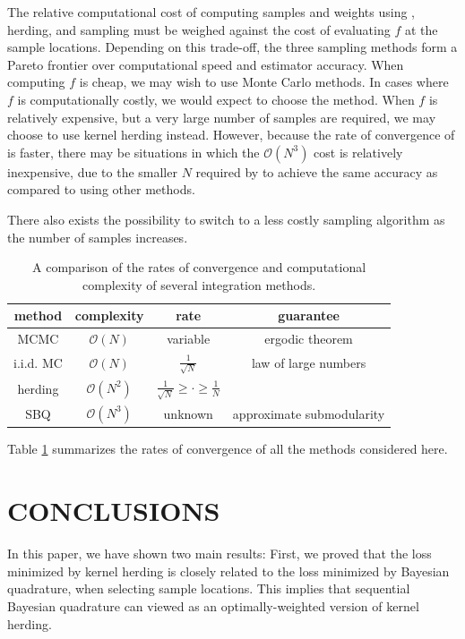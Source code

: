 The relative computational cost of computing samples and weights using \bq{}, herding, and sampling must be weighed against the cost of evaluating $f$ at the sample locations.  Depending on this trade-off, the three sampling methods form a Pareto frontier over computational speed and estimator accuracy.  When computing $f$ is cheap, we may wish to use Monte Carlo methods.  In cases where $f$ is computationally costly, we would expect to choose the \sbq{} method.  When $f$ is relatively expensive, but a very large number of samples are required, we may choose to use kernel herding instead.  However, because the rate of convergence of \sbq{} is faster, there may be situations in which the $\mathcal{O}(N^3)$ cost is relatively inexpensive, due to the smaller $N$ required by \sbq{} to achieve the same accuracy as compared to using other methods.  

There also exists the possibility to switch to a less costly sampling algorithm as the number of samples increases.
%
\begin{table}[t]
\begin{center}
\begin{tabular}{c|ccc}
method & complexity & rate & guarantee\\
\midrule
MCMC & $\mathcal{O}(N)$ & variable & ergodic theorem\\
i.i.d. MC & $\mathcal{O}(N)$ & $\frac{1}{\sqrt{N}}$ & law of large numbers\\
herding & $\mathcal{O}(N^2)$ & $\frac{1}{\sqrt{N}} \geq \cdot \geq \frac{1}{N}$ & \citep{chen2010super,bach2012equivalence} \\
SBQ & $\mathcal{O}(N^3)$ & unknown & approximate submodularity\\
\end{tabular}
\end{center}
\caption{A comparison of the rates of convergence and computational complexity of several integration methods.}
\label{tbl:rates}
\end{table}
%
Table \ref{tbl:rates} summarizes the rates of convergence of all the methods considered here.

\section{CONCLUSIONS}

In this paper, we have shown two main results:  First, we proved that the loss minimized by kernel herding is closely related to the loss minimized by Bayesian quadrature, when selecting sample locations. This implies that sequential Bayesian quadrature can viewed as an optimally-weighted version of kernel herding.

